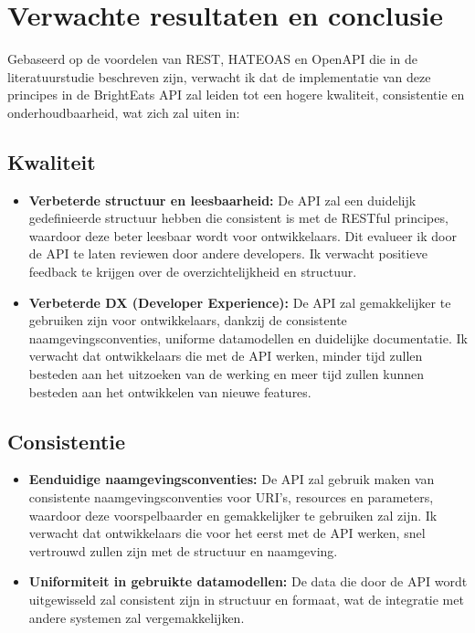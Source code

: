 \section{Verwachte resultaten en conclusie}%
\label{sec:verwachte_resultaten}

Gebaseerd op de voordelen van REST, HATEOAS en OpenAPI die in de literatuurstudie beschreven zijn, verwacht ik dat de implementatie van deze principes in de BrightEats API zal leiden tot een hogere kwaliteit, consistentie en onderhoudbaarheid, wat zich zal uiten in:

\subsection{Kwaliteit}

\begin{itemize}
    \item \textbf{Verbeterde structuur en leesbaarheid:} De API zal een duidelijk gedefinieerde structuur hebben die consistent is met de RESTful principes, waardoor deze beter leesbaar wordt voor ontwikkelaars. Dit evalueer ik door de API te laten reviewen door andere developers. Ik verwacht positieve feedback te krijgen over de overzichtelijkheid en structuur.
    \item \textbf{Verbeterde DX (Developer Experience):} De API zal gemakkelijker te gebruiken zijn voor ontwikkelaars, dankzij de consistente naamgevingsconventies, uniforme datamodellen en duidelijke documentatie. Ik verwacht dat ontwikkelaars die met de API werken, minder tijd zullen besteden aan het uitzoeken van de werking en meer tijd zullen kunnen besteden aan het ontwikkelen van nieuwe features.
\end{itemize}

\subsection{Consistentie}

\begin{itemize}
    \item \textbf{Eenduidige naamgevingsconventies:} De API zal gebruik maken van consistente naamgevingsconventies voor URI's, resources en parameters, waardoor deze voorspelbaarder en gemakkelijker te gebruiken zal zijn. Ik verwacht dat ontwikkelaars die voor het eerst met de API werken, snel vertrouwd zullen zijn met de structuur en naamgeving.
    \item \textbf{Uniformiteit in gebruikte datamodellen:} De data die door de API wordt uitgewisseld zal consistent zijn in structuur en formaat, wat de integratie met andere systemen zal vergemakkelijken.
\end{itemize}


